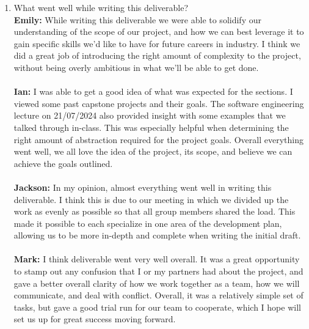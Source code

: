 \documentclass{article}
\begin{document}
\begin{enumerate}
    \item What went well while writing this deliverable? \\
    \textbf{Emily:} While writing this deliverable we were able to solidify our understanding of the scope of our project, and how we can best leverage it to 
                    gain specific skills we’d like to have for future careers in industry. I think we did a great job of introducing the right amount of 
                    complexity to the project, without being overly ambitious in what we’ll be able to get done.\\ \\
    \textbf{Ian:} I was able to get a good idea of what was expected for the sections. I viewed some past capstone projects and their goals. The software engineering 
                    lecture on 21/07/2024 also provided insight with some examples that we talked through in-class. This was especially helpful when determining the right amount of 
                    abstraction required for the project goals. Overall everything went well, we all love the idea of the project, its scope, and believe we can achieve the goals outlined.\\ \\
    \textbf{Jackson:} In my opinion, almost everything went well in writing this deliverable. I think this is due to our meeting in which we divided up the work 
                    as evenly as possible so that all group members shared the load. This made it possible to each specialize in one area of the development plan, allowing us to 
                    be more in-depth and complete when writing the initial draft.\\ \\
    \textbf{Mark:} I think deliverable went very well overall. It was a great opportunity to stamp out any confusion that I or my partners had about the project, and gave a better overall clarity
                   of how we work together as a team, how we will communicate, and deal with conflict. Overall, it was a relatively simple set of tasks, but gave a good trial run for our team to cooperate, 
                   which I hope will set us up for great success moving forward.\\ \\


\end{enumerate}
\end{document}
